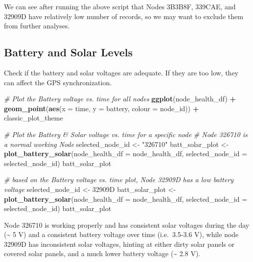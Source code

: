 \documentclass[
]{book}
\newenvironment{Shaded}{\begin{snugshade}}{\end{snugshade}}
\newcommand{\AttributeTok}[1]{\textcolor[rgb]{0.13,0.29,0.53}{#1}}
\newcommand{\CommentTok}[1]{\textcolor[rgb]{0.56,0.35,0.01}{\textit{#1}}}
\newcommand{\FunctionTok}[1]{\textcolor[rgb]{0.13,0.29,0.53}{\textbf{#1}}}
\newcommand{\NormalTok}[1]{#1}
\newcommand{\OtherTok}[1]{\textcolor[rgb]{0.56,0.35,0.01}{#1}}
\newcommand{\SpecialCharTok}[1]{\textcolor[rgb]{0.81,0.36,0.00}{\textbf{#1}}}
\newcommand{\StringTok}[1]{\textcolor[rgb]{0.31,0.60,0.02}{#1}}
\begin{document}
We can see after running the above script that Nodes 3B3B8F, 339CAE, and 32909D have relatively low number of records, so we may want to exclude them from further analyses.

\subsection{Battery and Solar Levels}\label{battery-and-solar-levels}

Check if the battery and solar voltages are adequate. If they are too low, they can affect the GPS synchronization.

\begin{Shaded}
\begin{Highlighting}[]
\CommentTok{\# Plot the Battery voltage vs. time for all nodes}
\FunctionTok{ggplot}\NormalTok{(node\_health\_df) }\SpecialCharTok{+}
  \FunctionTok{geom\_point}\NormalTok{(}\FunctionTok{aes}\NormalTok{(}\AttributeTok{x =}\NormalTok{ time,}
                 \AttributeTok{y =}\NormalTok{ battery,}
                 \AttributeTok{colour =}\NormalTok{ node\_id)) }\SpecialCharTok{+}
\NormalTok{  classic\_plot\_theme}

\CommentTok{\# Plot the Battery \& Solar voltage vs. time for a specific node}
\CommentTok{\# Node 326710 is a normal working Node}
\NormalTok{selected\_node\_id }\OtherTok{\textless{}{-}} \StringTok{"326710"}
\NormalTok{batt\_solar\_plot }\OtherTok{\textless{}{-}} \FunctionTok{plot\_battery\_solar}\NormalTok{(}\AttributeTok{node\_health\_df =}\NormalTok{ node\_health\_df, }
                                      \AttributeTok{selected\_node\_id =}\NormalTok{ selected\_node\_id)}
\NormalTok{batt\_solar\_plot }

\CommentTok{\# based on the Battery voltage vs. time plot, Node 32909D has a low battery voltage}
\NormalTok{selected\_node\_id }\OtherTok{\textless{}{-}} \StringTok{\textquotesingle{}32909D\textquotesingle{}}
\NormalTok{batt\_solar\_plot }\OtherTok{\textless{}{-}} \FunctionTok{plot\_battery\_solar}\NormalTok{(}\AttributeTok{node\_health\_df =}\NormalTok{ node\_health\_df, }
                                      \AttributeTok{selected\_node\_id =}\NormalTok{ selected\_node\_id)}
\NormalTok{batt\_solar\_plot }
\end{Highlighting}
\end{Shaded}

Node 326710 is working properly and has consistent solar voltages during the day (\textasciitilde{} 5 V) and a consistent battery voltage over time (i.e.~3.5-3.6 V), while node 32909D has inconsistent solar voltages, hinting at either dirty solar panels or covered solar panels, and a much lower battery voltage (\textasciitilde{} 2.8 V).
\end{document}
